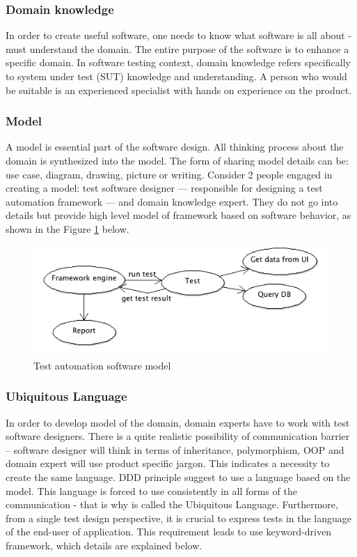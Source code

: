 \documentclass[12pt,twoside]{article}
\begin{document}
\subsubsection{Domain knowledge}
In order to create useful software, one needs to know what software is all about - must understand the domain. The entire purpose of the software is to enhance a specific domain. 
In software testing context, domain knowledge refers specifically to system under test (SUT) knowledge and understanding. A person who would be suitable is an experienced specialist with hands on experience on the product.  

\subsubsection{Model}
A model is essential part of the software design. All thinking process about the domain is synthesized into the model. The form of sharing model details can be: use case, diagram, drawing, picture or writing. 
Consider 2 people engaged in creating a model: test software designer --- responsible for designing a test automation framework --- and domain knowledge expert. They do not go into details but provide high level model of framework based on software behavior, as shown in the Figure \ref{model} below.  

\begin{figure}[H]
\centering
\includegraphics[width=120mm]{model.png}
\caption{Test automation software model}
\label{model}
\end{figure}

\subsubsection{Ubiquitous Language}
In order to develop model of the domain, domain experts have to work with test software designers. There is a quite realistic possibility of communication barrier -- software designer will think in terms of inheritance, polymorphism, OOP and domain expert will use product specific jargon. This indicates a necessity to create the same language. DDD principle suggest to use a language based on the model. This language is forced to use consistently in all forms of the communication - that is why is called the Ubiquitous Language. Furthermore, from a single test design perspective, it is crucial to express tests in the language of the end-user of application. This requirement leads to use keyword-driven framework, which details are explained below.   
\end{document}
